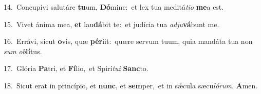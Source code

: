 {\numbfont\textcolor{\numbcolor}{14.}}~Concupívi salutáre \textbf{tu}\-um, \textbf{Dó}\-mine:~\star et lex tua meditá\-\textit{ti}\-\textit{o} \textbf{me}\-a est.\par
{\numbfont\textcolor{\numbcolor}{15.}}~Vivet ánima mea, \textbf{et} lau\-\textbf{dá}\-bit te:~\star et judícia tua \textit{ad}\-\textit{ju}\textbf{vá}bunt me.\par
{\numbfont\textcolor{\numbcolor}{16.}}~Errávi, sicut \textbf{o}\-vis, quæ \textbf{pér}\-iit:~\star quære servum tuum, quia mandáta tua non \textit{sum} \textit{ob}\-\textbf{lí}tus.\par
{\numbfont\textcolor{\numbcolor}{17.}}~Glória \textbf{Pa}\-tri, et \textbf{Fí}\-lio,~\star et Spirí\-\textit{tu}\-\textit{i} \textbf{Sanc}\-to.\par
{\numbfont\textcolor{\numbcolor}{18.}}~Sicut erat in princípio, et \textbf{nunc}\-, et \textbf{sem}\-per,~\star et in sǽcula sæcu\-\textit{ló}\-\textit{rum}. \textbf{A}\-men.\par
